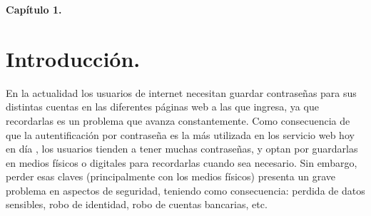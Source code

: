 \documentclass[12pt, a4paper, titlepage]{article}
\begin{document}
	\begin{appendix}
		\renewcommand*\contentsname{{\textcolor{azulescom}{Índice.}}}
		\tableofcontents
		\newpage
		\renewcommand*\listfigurename{{\textcolor{azulescom}{Índice de figuras.}}}
		\listoffigures
		\newpage
		\newpage
		\renewcommand*\listtablename{{\textcolor{azulescom}{Índice de cuadros.}}}
		\listoftables
		
		\newpage
		\renewcommand*\glossaryname{{\textcolor{azulescom}{Glosario.}}}
		\printglossaries
	\end{appendix}
	\newpage
	
	\textbf{\textcolor{azulescom}{\Huge{Capítulo 1.}}}

	\renewcommand\thesection{\arabic{section}}	
	\section{\textcolor{azulescom}{Introducción.}}
		En la actualidad los usuarios de internet necesitan guardar contraseñas para sus distintas cuentas en las diferentes páginas web a las que ingresa, ya que recordarlas es un problema que avanza constantemente. Como consecuencia de que la autentificación por contraseña es la más utilizada en los servicio web hoy en día \cite{ComparisonAuthenticationMethodsResources}, los usuarios tienden a tener muchas contraseñas, y optan por guardarlas en medios físicos o digitales para recordarlas cuando sea necesario. Sin embargo, perder esas claves (principalmente con los medios físicos) presenta un grave problema en aspectos de seguridad, teniendo como consecuencia: perdida de datos sensibles, robo de identidad, robo de cuentas bancarias, etc. 
		
		
		
		
\end{document}
